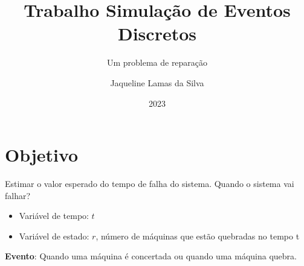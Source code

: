 \documentclass[
  12pt,
]{article}
\title{Trabalho Simulação de Eventos Discretos}
\subtitle{Um problema de reparação}
\author{Jaqueline Lamas da Silva}
\date{2023}
\begin{document}
\maketitle

{
\setcounter{tocdepth}{3}
\tableofcontents
}
\addtolength{\headheight}{2cm}
\renewcommand{\headrulewidth}{1pt}

\pagestyle{fancyplain}
\renewcommand{\footrulewidth}{0pt}

\hypertarget{objetivo}{%
\section{Objetivo}\label{objetivo}}

Estimar o valor esperado do tempo de falha do sistema. Quando o sistema
vai falhar?

\begin{itemize}
\item
  Variável de tempo: \(t\)
\item
  Variável de estado: \(r\), número de máquinas que estão quebradas no
  tempo t
\end{itemize}

\textbf{Evento}: Quando uma máquina é concertada ou quando uma máquina
quebra.
\end{document}

